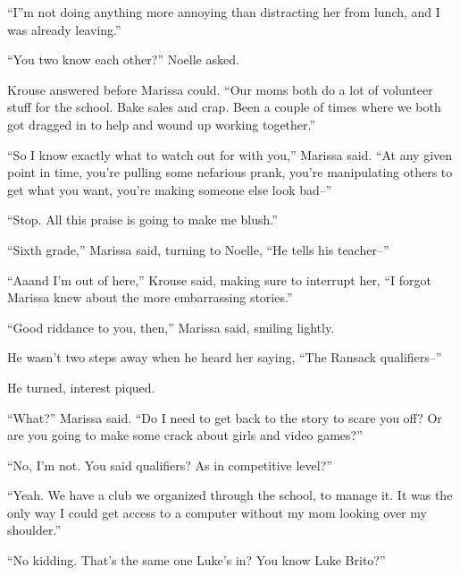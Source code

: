 ``I''m not doing anything more annoying than distracting her from lunch, and I was already leaving.''



``You two know each other?'' Noelle asked.



Krouse answered before Marissa could.  ``Our moms both do a lot of volunteer stuff for the school.  Bake sales and crap.  Been a couple of times where we both got dragged in to help and wound up working together.''



``So I know exactly what to watch out for with you,'' Marissa said.  ``At any given point in time, you're pulling some nefarious prank, you're manipulating others to get what you want, you're making someone else look bad--''



``Stop.  All this praise is going to make me blush.''



``Sixth grade,'' Marissa said, turning to Noelle, ``He tells his teacher--''



``Aaand I'm out of here,'' Krouse said, making sure to interrupt her, ``I forgot Marissa knew about the more embarrassing stories.''



``Good riddance to you, then,'' Marissa said, smiling lightly.



He wasn't two steps away when he heard her saying, ``The Ransack qualifiers--''



He turned, interest piqued.



``What?'' Marissa said.  ``Do I need to get back to the story to scare you off?  Or are you going to make some crack about girls and video games?''



``No, I'm not.  You said qualifiers?  As in competitive level?''



``Yeah.  We have a club we organized through the school, to manage it.  It was the only way I could get access to a computer without my mom looking over my shoulder.''



``No kidding.  That's the same one Luke's in?  You know Luke Brito?''



